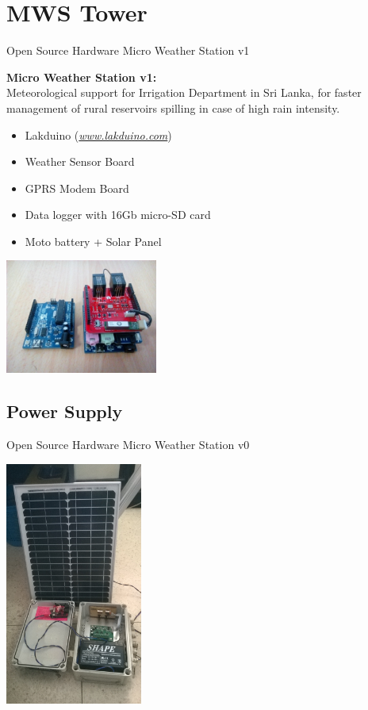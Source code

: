 \documentclass[xcolor=dvipsnames,beamer,unknownkeysallowed]{beamer} %
\begin{document}
\section{ MWS Tower}
\begin{frame}[fragile]{Open Source Hardware Micro Weather Station v1}

\textbf{Micro Weather Station v1:}\\
Meteorological support for Irrigation Department in Sri Lanka, for faster management of rural reservoirs spilling in case of high rain intensity.
\vspace{5mm}
\begin{itemize}
 \item Lakduino (\href{www.lakduino.com}{\textit{www.lakduino.com}})
 \item Weather Sensor Board
 \item GPRS Modem Board
 \item Data logger with 16Gb micro-SD card
 \item Moto battery + Solar Panel
\end{itemize}
\begin{flushright}
  \includegraphics[width=5cm]{MWSv1}
  \hspace{5mm}
\end{flushright}
\end{frame}

\subsection{Power Supply}
\begin{frame}[fragile]{Open Source Hardware Micro Weather Station v0}

\begin{center}
\includegraphics[width=4.5cm]{MWSv1_power}
\end{center}
\end{frame}
\end{document}
